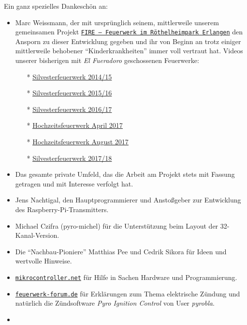 \documentclass[paper=a4, parskip, numbers=noenddot, toc=listof, headsepline]{scrbook}
\newcommand{\pic}{\emph{Pyro Ignition Control}}
\newcommand{\anlage}{\emph{El Fueradoro}}
\begin{document}
		Ein ganz spezielles Dankeschön an:
		\begin{itemize}
			\item
			      Marc Weissmann, der mit ursprünglich seinem, mittlerweile unserem gemeinsamen Projekt \href{http://www.facebook.com/FIREErlangen}{\texttt{FIRE~-- Feuerwerk im Röthel\-heim\-park Er\-langen}} den Ansporn zu dieser Entwicklung gegeben und ihr von Beginn an trotz einiger mittlerweile behobener \enquote{Kinderkrankheiten} immer voll vertraut hat. Videos unserer bisherigen mit {\anlage} geschossenen Feuerwerke:
			      \begin{itemize}
				      \item[*] \underline{\href{https://vimeo.com/116115628}{Silvesterfeuerwerk 2014/15}}
				      \item[*] \underline{\href{https://vimeo.com/150594996}{Silvesterfeuerwerk 2015/16}}
				      \item[*] \underline{\href{https://vimeo.com/198168273}{Silvesterfeuerwerk 2016/17}}
				      \item[*] \underline{\href{https://www.youtube.com/watch?v=uPTW1dpsVoU}{Hochzeitsfeuerwerk April 2017}}
				      \item[*] \underline{\href{https://www.youtube.com/watch?v=q-nfOxinUgU}{Hochzeitsfeuerwerk August 2017}}
				      \item[*] \underline{\href{https://www.youtube.com/watch?v=unH9tJSg1mw}{Silvesterfeuerwerk 2017/18}}
			      \end{itemize}
			\item
			      Das gesamte private Umfeld, das die Arbeit am Projekt stets mit Fassung getragen und mit Interesse verfolgt hat.
			\item
			      Jens Nachtigal, den Hauptprogrammierer und Anstoßgeber zur Entwicklung des Raspberry-Pi-Transmitters.
			\item
			      Michael Czifra (pyro-michel) für die Unterstützung beim Layout der 32-Kanal-Version.
			\item
			      Die \enquote{Nachbau-Pioniere} Matthias Pee und Cedrik Sikora für Ideen und wertvolle Hinweise.
			\item
			      \href{http://www.mikrocontroller.net}{\texttt{mikrocontroller.net}} für Hilfe in Sachen Hardware und Programmierung.
			\item
			      \href{http://www.feuerwerk-forum.de}{\texttt{feuerwerk-forum.de}} für Erklärungen zum Thema elektrische Zündung und natürlich die Zündsoftware {\pic} von User \emph{pyrobla}.
			\item

\end{itemize}
\end{document}
